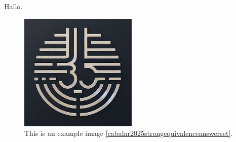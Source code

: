 \documentclass{article}
\begin{document}
    Hallo.
    \begin{figure}[h]
        \centering
        \includegraphics[width=0.5\textwidth]{logo.jpeg}
        \caption{This is an example image \ref{cabalar2025strongequivalenceanswerset}.}
    \end{figure}

    
    
\end{document}
